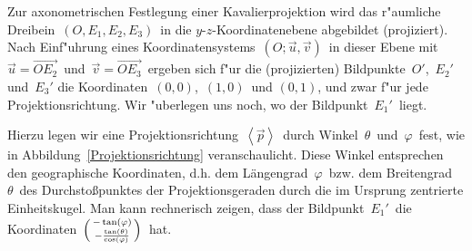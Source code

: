 \begin{Aufgabe}
\label{Analyse}%
\footnotesize%
Zur axonometrischen Festlegung einer Kavalierprojektion wird das r"aumliche Dreibein\, $(O, E_1, E_2, E_3)$\, in die $y$-$z$-Koordinatenebene abgebildet (projiziert). Nach Einf"uhrung eines Koordinatensystems\, $\left( O; \vec{u},\vec{v}\right)$\, in dieser Ebene mit\, $\vec{u} = \overrightarrow{O E_2}$\, und\, $\vec{v} = \overrightarrow{O E_3}$\, ergeben sich f"ur die (projizierten) Bildpunkte\, $O'$,\, $E_2'$\, und\, $E_3'$ die  Koordinaten\, $(0,0)$,\, $(1,0)$\, und $(0,1)$, und zwar f"ur jede Projektionsrichtung. Wir "uberlegen uns noch, wo der Bildpunkt\, $E_1'$\, liegt.

Hierzu legen wir eine Projektionsrichtung\, $\left\langle\vec{p}\right\rangle$\, durch Winkel\, $\theta$\, und\, $\varphi$\, fest, wie in Abbildung~\ref{Projektionsrichtung} veranschaulicht. Diese Winkel entsprechen den \glqq geographische Koordinaten\grqq, d.h. dem Längengrad\, $\varphi$\, bzw. dem Breitengrad  \, $\theta$\, des Durchstoßpunktes der Projektionsgeraden durch die im Ursprung zentrierte Einheitskugel. Man kann rechnerisch zeigen, dass der Bildpunkt\, $E_1'$\, die Koordinaten\, $\begin{psmallmatrix} - \tan(\varphi) \\ - \frac{\tan(\theta)}{\cos(\varphi)} \end{psmallmatrix}$\, hat.


\end{Aufgabe}
